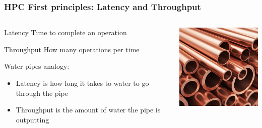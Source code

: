 \begin{frame}[containsverbatim]
\frametitle{HPC First principles: Latency and Throughput}
\begin{columns}[c]
	\begin{column}{5cm}
	\begin{alertblock}{Latency}
	Time to complete an operation
	\end{alertblock}
	\begin{alertblock}{Throughput}
	How many operations per time
	\end{alertblock}
	Water pipes analogy:
	\begin{itemize}
	\item Latency is how long it takes to water to go through the pipe
	\item Throughput is the amount of water the pipe is outputting
	\end{itemize}

	\end{column} 
	\begin{column}{5cm}
	\includegraphics[width=5cm]{DayGilles/images/waterpipes.jpg}
	\end{column}
\end{columns} 
\end{frame}


